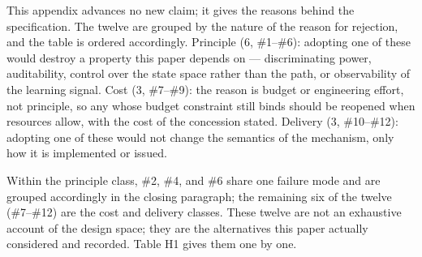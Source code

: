 \documentclass[letterpaper]{article}
\begin{document}


This appendix advances no new claim; it gives the reasons behind the specification. The twelve are grouped by the nature of the reason for rejection, and the table is ordered accordingly. Principle (6, \#1--\#6): adopting one of these would destroy a property this paper depends on --- discriminating power, auditability, control over the state space rather than the path, or observability of the learning signal. Cost (3, \#7--\#9): the reason is budget or engineering effort, not principle, so any whose budget constraint still binds should be reopened when resources allow, with the cost of the concession stated. Delivery (3, \#10--\#12): adopting one of these would not change the semantics of the mechanism, only how it is implemented or issued.


Within the principle class, \#2, \#4, and \#6 share one failure mode and are grouped accordingly in the closing paragraph; the remaining six of the twelve (\#7--\#12) are the cost and delivery classes. These twelve are not an exhaustive account of the design space; they are the alternatives this paper actually considered and recorded. Table H1 gives them one by one.
\end{document}
